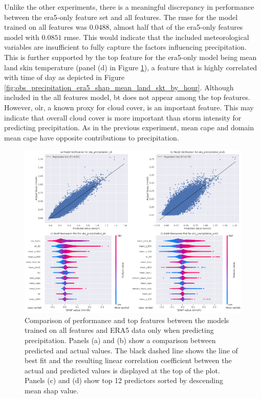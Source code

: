 Unlike the other experiments, there is a meaningful discrepancy in performance between the \acrshort{era5}-only feature set and all features. The \acrshort{rmse} for the model trained on all features was $0.0488$, almost half that of the \acrshort{era5}-only features model with $0.0851$ \acrshort{rmse}. This would indicate that the included meteorological variables are insufficient to fully capture the factors influencing precipitation. This is further supported by the top feature for the \acrshort{era5}-only model being mean land skin temperature (panel (d) in Figure \ref{fig:obs_precipitation_summary}), a feature that is highly correlated with time of day as depicted in Figure \ref{fig:obs_precipitation_era5_shap_mean_land_skt_by_hour}. Although included in the all features model, \acrfull{bt} does not appear among the top features. However, \acrfull{olr}, a known proxy for cloud cover, is an important feature. This may indicate that overall cloud cover is more important than storm intensity for predicting precipitation. As in the previous experiment, mean \acrshort{cape} and domain mean \acrshort{cape} have opposite contributions to precipitation.

\begin{figure}[ht]
    \centering
    \includegraphics[width=\textwidth]{../figures/generated/experiments/obs_precipitation/obs_precipitation_summary.png}
    \caption{Comparison of performance and top features between the models trained on all features and ERA5 data only when predicting precipitation. Panels (a) and (b) show a comparison between predicted and actual values. The black dashed line shows the line of best fit and the resulting linear correlation coefficient between the actual and predicted values is displayed at the top of the plot. Panels (c) and (d) show top 12 predictors sorted by descending mean \acrshort{shap} value.}
    \label{fig:obs_precipitation_summary}
\end{figure}

